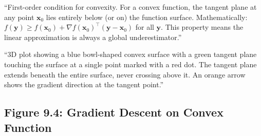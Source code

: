 \documentclass[12pt]{article}
\begin{document}
\begin{description}[style=nextline, leftmargin=0pt]
    \item[Caption Text]
    ``First-order condition for convexity. For a convex function, the tangent plane at any point $\mathbf{x}_0$ lies entirely below (or on) the function surface. Mathematically: $f(\mathbf{y}) \geq f(\mathbf{x}_0) + \nabla f(\mathbf{x}_0)^\top (\mathbf{y} - \mathbf{x}_0)$ for all $\mathbf{y}$. This property means the linear approximation is always a global underestimator.''

    \item[Alt-Text for Accessibility]
    ``3D plot showing a blue bowl-shaped convex surface with a green tangent plane touching the surface at a single point marked with a red dot. The tangent plane extends beneath the entire surface, never crossing above it. An orange arrow shows the gradient direction at the tangent point.''
\end{description}

\newpage

\subsection{Figure 9.4: Gradient Descent on Convex Function}
\end{document}

